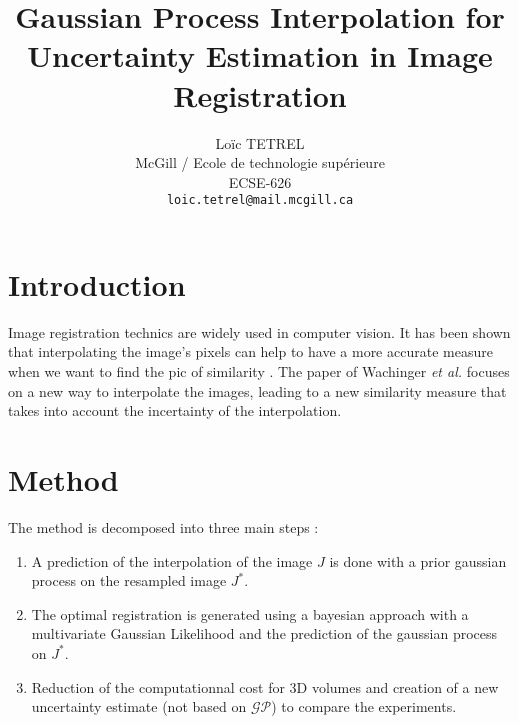 \documentclass[10pt,twocolumn,letterpaper]{article}
\begin{document}
\title{Gaussian Process Interpolation for Uncertainty Estimation in Image Registration}

\author{Loïc TETREL\\
McGill / Ecole de technologie supérieure \\
ECSE-626\\
{\tt\small loic.tetrel@mail.mcgill.ca}
}

\maketitle


\section{Introduction}

Image registration technics are widely used in computer vision. It has been shown that interpolating the image's pixels can help to have a more accurate measure when we want to find the pic of similarity \cite{hill2001medical}. The paper of Wachinger \textit{et al.} \cite{wachinger2014gaussian} focuses on a new way to interpolate the images, leading to a new similarity measure that takes into account the incertainty of the interpolation.

\section{Method}

The method is decomposed into three main steps :
\begin{enumerate}
\item A prediction of the interpolation of the image $J$ is done with a prior gaussian process on the resampled image $J^*$.
\item The optimal registration is generated using a bayesian approach with a multivariate Gaussian Likelihood and the prediction of the gaussian process on $J^*$.
\item Reduction of the computationnal cost for 3D volumes and creation of a new uncertainty estimate (not based on $\mathcal{GP}$) to compare the experiments.
\end{enumerate}
\end{document}
